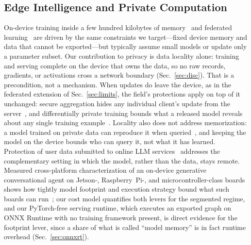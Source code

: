 \documentclass[journal]{IEEEtran}
\begin{document}
\subsection{Edge Intelligence and Private Computation}
On-device training inside a few hundred kilobytes of
memory~\cite{lin2022ondevice} and federated learning~\cite{mcmahan2017federated}
are driven by the same constraints we target---fixed device memory and data
that cannot be exported---but typically assume small models or update only a
parameter subset. Our contribution to privacy is data locality alone:
training and serving complete on the device that owns the data, so no raw
records, gradients, or activations cross a network boundary
(Sec.~\ref{sec:disc}). That is a precondition, not a mechanism. When updates
do leave the device, as in the federated extension of
Sec.~\ref{sec:limits}, the field's protections apply on top of it unchanged:
secure aggregation hides any individual client's update from the
server~\cite{bonawitz2017secureagg}, and differentially private training
bounds what a released model reveals about any single training
example~\cite{abadi2016dpsgd,mcmahan2018dpfedavg}. Locality also does not
address memorization: a model trained on private data can reproduce it when
queried~\cite{carlini2021extracting}, and keeping the model on the device
bounds who can query it, not what it has learned. Protection of user data
submitted to online LLM services~\cite{bai2025safeguarding} addresses the
complementary setting in which the model, rather than the data, stays
remote. Measured cross-platform characterization of an on-device generative
conversational agent on Jetson-, Raspberry~Pi-, and microcontroller-class
boards shows how tightly model footprint and execution strategy bound what
such boards can run~\cite{firpo2026convagent}; our cost model quantifies both
levers for the segmented regime, and our PyTorch-free serving runtime, which
executes an exported graph on ONNX Runtime with no training framework
present, is direct evidence for the footprint lever, since a share of what
is called ``model memory'' is in fact runtime overhead
(Sec.~\ref{sec:onnxrt}).
\end{document}
